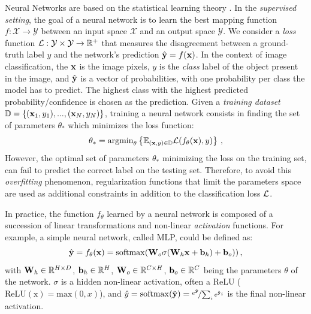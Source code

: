 Neural Networks are based on the statistical learning theory \citep{vapnik1999statstheory}. In the
\textit{supervised setting}, the goal of a neural network is to learn the best mapping function $f :
      \mathcal{X} \rightarrow \mathcal{Y}$ between an input space $\mathcal{X}$ and an output space
$\mathcal{Y}$.  We consider a \textit{loss} function $\mathcal{L} : \mathcal{Y} \times \mathcal{Y} \rightarrow
      \mathbb{R}^+$ that measures the disagreement between a ground-truth label $y$ and the network's
prediction $\hat{\mathbf{y}} = f(\mathbf{x})$. In the context of image classification, the $\mathbf{x}$ is the image
pixels, $y$ is the \textit{class} label of the object present in the image, and $\hat{\mathbf{y}}$ is a
vector of probabilities, with one probability per class the model has to predict. The highest class
with the highest predicted probability/confidence is chosen as the prediction.
Given a \textit{training dataset} $\mathbb{D} = \{(\mathbf{x}_1, y_1), ..., (\mathbf{x}_N, y_N)\}$, training a neural network
consists in finding the set of parameters $\theta_*$ which minimizes the loss function:
%
\begin{equation}
      \theta_* = \operatorname{argmin}_{\theta} \left \{ \mathbb{E}_{(\mathbf{x},y)\in \mathbb{D}} \mathcal{L}(f_\theta(\mathbf{x}), y)\right \}\,,
      \label{eq:intro_optim}
\end{equation}
%
However, the optimal set of parameters $\theta_*$ minimizing the loss on the training set, can fail
to predict the correct label on the testing set. Therefore, to avoid this \textit{overfitting}
phenomenon, regularization functions that limit the parameters space are used as additional
constraints in addition to the classification loss $\mathcal{L}$.

In practice, the function $f_\theta$ learned by a neural network is composed of a succession of linear
transformations and non-linear \textit{activation} functions. For example, a simple neural network,
called \ac{MLP}, could be defined as:
%
\begin{equation}
      \hat{\mathbf{y}} = f_\theta(\mathbf{x}) = \operatorname{softmax}(\mathbf{W}_o \sigma(\mathbf{W}_h \mathbf{x} + \mathbf{b}_h) + \mathbf{b}_o))\,,
      \label{eq:intro_mlp}
\end{equation}
%
\noindent with $\mathbf{W}_h \in \mathbb{R}^{H \times D}$, $\mathbf{b}_h \in \mathbb{R}^{H}$, $\mathbf{W}_o \in
      \mathbb{R}^{C \times H}$, $\mathbf{b}_o \in \mathbb{R}^{C}$ being the parameters $\theta$ of the
network. $\sigma$ is a hidden non-linear activation, often a \ac{ReLU}
($\operatorname{ReLU(x)} = \text{max}(0, x)$), and $\hat{y} = \operatorname{softmax}(\tilde{\mathbf{y}}) =
      \nicefrac{e^{\tilde{\mathbf{y}}}}{\sum_{i} e^{\tilde{\mathbf{y}}_i}}$ is the final non-linear activation.

